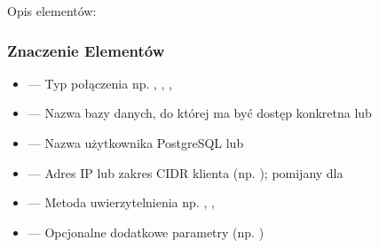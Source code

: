 \documentclass[a4paper,11pt,openany,english]{sphinxmanual}
\begin{document}
\sphinxAtStartPar
Opis elementów:


\subsubsection{Znaczenie Elementów}
\label{\detokenize{rozdzial2/Bezpieczenstwo/index:znaczenie-elementow}}\begin{itemize}
\item {} 
\sphinxAtStartPar
{} — Typ połączenia \textendash{} np. , , , 

\item {} 
\sphinxAtStartPar
{} — Nazwa bazy danych, do której ma być dostęp \textendash{} konkretna lub 

\item {} 
\sphinxAtStartPar
{} — Nazwa użytkownika PostgreSQL lub 

\item {} 
\sphinxAtStartPar
{} — Adres IP lub zakres CIDR klienta (np. ); pomijany dla 

\item {} 
\sphinxAtStartPar
{} — Metoda uwierzytelnienia \textendash{} np. , , 

\item {} 
\sphinxAtStartPar
\sphinxcode{\sphinxupquote{{[}opcje{]}}} — Opcjonalne dodatkowe parametry (np. )

\end{itemize}
\end{document}
